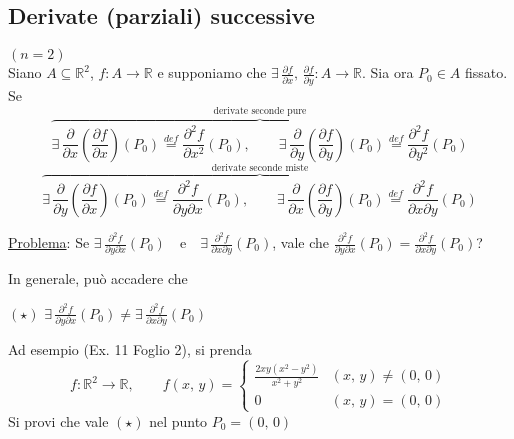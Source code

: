 \subsection{Derivate (parziali) successive}
$(n=2)$\\
Siano $A \subseteq \mathbb{R}^2$, $f : A \longrightarrow \mathbb{R}$ e supponiamo che $\displaystyle \exists \, \frac{\partial f}{\partial x},\,\frac{\partial f}{\partial y} : A \longrightarrow \mathbb{R}$.
Sia ora $P_0 \in A$ fissato.
Se
$$
\overbrace{
\exists \, \frac{\partial}{\partial x} \left( \frac{\partial f}{\partial x} \right)(P_0) \overset{def}{=} \frac{\partial^2 f}{\partial x^2}(P_0),\qquad
\exists \, \frac{\partial}{\partial y} \left( \frac{\partial f}{\partial y} \right)(P_0) \overset{def}{=} \frac{\partial^2 f}{\partial y^2}(P_0)
}^{\text{derivate seconde pure}}
$$
$$
\overbrace{
\exists \, \frac{\partial}{\partial y} \left( \frac{\partial f}{\partial x} \right)(P_0) \overset{def}{=} \frac{\partial^2 f}{\partial y \partial x}(P_0),\qquad
\exists \, \frac{\partial}{\partial x} \left( \frac{\partial f}{\partial y} \right)(P_0) \overset{def}{=} \frac{\partial^2 f}{\partial x \partial y}(P_0)
}^{\text{derivate seconde miste}}
$$
\vskip 16pt

\underline{Problema}: Se $\displaystyle \exists \, \frac{\partial^2 f}{\partial y \partial x}(P_0) \quad \text{e} \quad \exists \, \frac{\partial^2 f}{\partial x \partial y}(P_0)$, vale che $\displaystyle \frac{\partial^2 f}{\partial y \partial x}(P_0) = \frac{\partial^2 f}{\partial x \partial y}(P_0)$?

\begin{obs}
In generale, può accadere che
\begin{center}
$\mathrm{(\star)}$
\hfill
$\displaystyle \exists \, \frac{\partial^2 f}{\partial y \partial x}(P_0) \neq \exists \, \frac{\partial^2 f}{\partial x \partial y}(P_0)$
\hfill \null \\
\end{center}

Ad esempio (Ex. 11 Foglio 2), si prenda
$$
f: \mathbb{R}^2 \longrightarrow \mathbb{R}, \qquad
f(x,\,y) =
\begin{cases}
\displaystyle \frac{2xy(x^2 - y^2)}{x^2 + y^2} & (x,\,y) \neq (0,\,0) \\
0 & (x,\,y) = (0,\,0)
\end{cases}
$$
Si provi che vale $(\star)$ nel punto $P_0 = (0,\,0)$
\end{obs}

